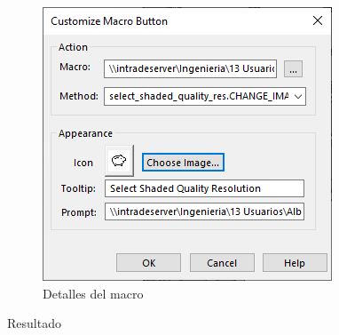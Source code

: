 \documentclass[12pt,letterpaper,final]{report}
\begin{document}
\begin{figure}[H]
	\centering
	\includegraphics[width=0.75\linewidth, height=0.5\textheight,keepaspectratio]{Imagenes/solidworks_macro_14}
	\caption{Detalles del macro}
	\label{fig:solidworksmacro14}
\end{figure}

\pagebreak

{\LARGE Resultado}
\end{document}
